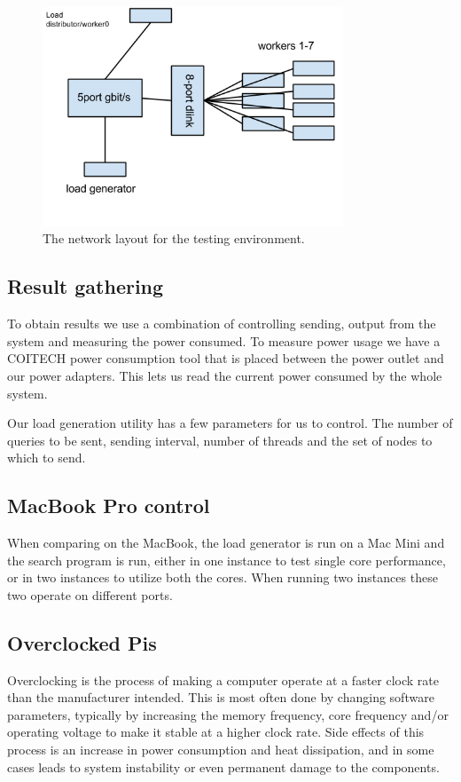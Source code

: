 \begin{figure}[h]
    \centering
    \includegraphics[width=0.8\textwidth]{experiments/networklayout}
    \caption{The network layout for the testing environment.}
    \label{fig:network}
\end{figure}


\subsection{Result gathering}
To obtain results we use a combination of controlling sending, output from the system and measuring the power consumed. To measure power usage we have a COITECH power consumption tool that is placed between the power outlet and our power adapters.
This lets us read the current power consumed by the whole system.

Our load generation utility has a few parameters for us to control. The number of queries to be sent, sending interval, number of threads and the set of nodes to which to send.

\subsection{MacBook Pro control}
When comparing on the MacBook, the load generator is run on a Mac Mini and the search program is run, either in one instance to test single core performance, or in two instances to utilize both the cores.
When running two instances these two operate on different ports.

\subsection{Overclocked Pis}
Overclocking is the process of making a computer operate at a faster clock rate than the manufacturer intended.
This is most often done by changing software parameters, typically by increasing the memory frequency, core frequency and/or operating voltage to make it stable at a higher clock rate.
Side effects of this process is an increase in power consumption and heat dissipation, and in some cases leads to system instability or even permanent damage to the components.


